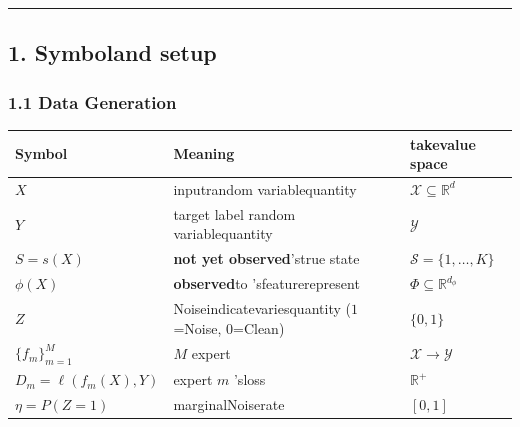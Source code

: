 \documentclass[
  12pt,
]{article}
\begin{document}
\begin{center}\rule{0.5\linewidth}{0.5pt}\end{center}

\subsection{1. Symboland setup}\label{ux7b26ux53f7ux4e0eux8bbeux5b9a}

\subsubsection{1.1 Data Generation}\label{ux6570ux636eux751fux6210}

\begin{longtable}[]{@{}
  >{\raggedright\arraybackslash}p{}
  >{\raggedright\arraybackslash}p{}
  >{\raggedright\arraybackslash}p{}@{}}
\toprule\noalign{}
\begin{minipage}[b]{\linewidth}\raggedright
Symbol
\end{minipage} & \begin{minipage}[b]{\linewidth}\raggedright
Meaning
\end{minipage} & \begin{minipage}[b]{\linewidth}\raggedright
takevalue space 
\end{minipage} \\
\midrule\noalign{}
\endhead
\bottomrule\noalign{}
\endlastfoot
\(X\) & inputrandom variablequantity  & \(\mathcal{X} \subseteq \mathbb{R}^d\) \\
\(Y\) & target label random variablequantity  & \(\mathcal{Y}\) \\
\(S = s(X)\) & \textbf{not yet observed}'strue state &
\(\mathcal{S} = \{1,\dots,K\}\) \\
\(\phi(X)\) & \textbf{observed}to 'sfeaturerepresent &
\(\Phi \subseteq \mathbb{R}^{d_\phi}\) \\
\(Z\) & Noiseindicatevariesquantity (\(1\)=Noise, \(0\)=Clean) & \(\{0,1\}\) \\
\(\{f_m\}_{m=1}^M\) & \(M\) expert  & \(\mathcal{X} \to \mathcal{Y}\) \\
\(D_m = \ell(f_m(X), Y)\) & expert  \(m\) 'sloss & \(\mathbb{R}^+\) \\
\(\eta = P(Z = 1)\) & marginalNoiserate  & \([0,1]\) \\
\end{longtable}
\end{document}
